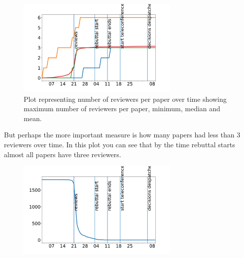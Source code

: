 \begin{figure}[htb]
\includegraphics[width=0.70\textwidth]{diagrams/neurips/number-of-reviews-over-time.pdf}


\caption{Plot representing number of reviewers per paper over time showing maximum number of reviewers per paper, minimum, median and mean. }
\label{number-of-reviews-over-time}
\end{figure}

But perhaps the more important measure is how many papers had less than
3 reviewers over time. In this plot you can see that by the time
rebuttal starts almost all papers have three reviewers.

\begin{Shaded}
\begin{Highlighting}[]
\OperatorTok{=}\OperatorTok{=}
\OperatorTok{=}\OperatorTok{\textless{}}\NormalTok{()}
\end{Highlighting}
\end{Shaded}

\begin{figure}[htb]
\includegraphics[width=0.70\textwidth]{diagrams/neurips/paper-short-reviews.pdf}


\caption{}
\label{paper-short-reviews}
\end{figure}

